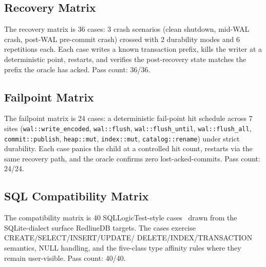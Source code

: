 \subsection{Recovery Matrix}
The recovery matrix is 36 cases: 3 crash scenarios (clean shutdown,
mid-WAL crash, post-WAL pre-commit crash) crossed with 2 durability
modes and 6 repetitions each. Each case writes a known transaction
prefix, kills the writer at a deterministic point, restarts, and
verifies the post-recovery state matches the prefix the oracle has
acked. Pass count: 36/36.

\subsection{Failpoint Matrix}
The failpoint matrix is 24 cases: a deterministic fail-point hit
schedule across 7 sites
(\texttt{wal::write\_encoded}, \texttt{wal::flush},
\texttt{wal::flush\_until}, \texttt{wal::flush\_all},
\texttt{commit::publish}, \texttt{heap::mut}, \texttt{index::mut},
\texttt{catalog::rename}) under strict durability. Each case panics
the child at a controlled hit count, restarts via the same recovery
path, and the oracle confirms zero lost-acked-commits. Pass count:
24/24.

\subsection{SQL Compatibility Matrix}
The compatibility matrix is 40 SQLLogicTest-style
cases~\cite{sqllogictest} drawn from the SQLite-dialect surface
RedlineDB targets. The cases exercise CREATE/SELECT/INSERT/UPDATE/
DELETE/INDEX/TRANSACTION semantics, NULL handling, and the
five-class type affinity rules where they remain user-visible.
Pass count: 40/40.
